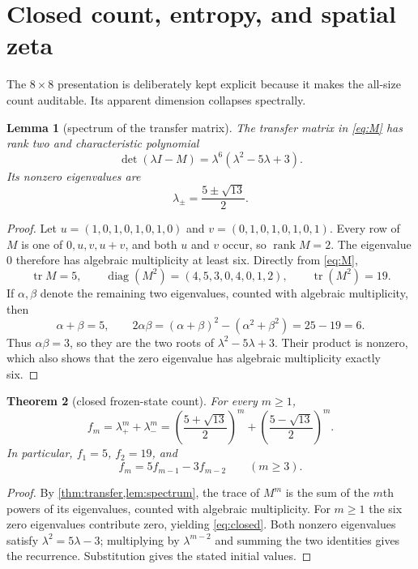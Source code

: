 \documentclass[11pt,a4paper]{amsart}
\newtheorem{theorem}{Theorem}[section]
\newtheorem{lemma}[theorem]{Lemma}
\theoremstyle{definition}
\theoremstyle{remark}
\newcommand{\tr}{\operatorname{tr}}
\begin{document}
\section{Closed count, entropy, and spatial zeta}

The $8\times8$ presentation is deliberately kept explicit because it makes
the all-size count auditable.  Its apparent dimension collapses
spectrally.

\begin{lemma}[spectrum of the transfer matrix]\label{lem:spectrum}
The transfer matrix in \eqref{eq:M} has rank two and characteristic
polynomial
\[
 \det(\lambda I-M)=\lambda^6(\lambda^2-5\lambda+3).
\]
Its nonzero eigenvalues are
\[
 \lambda_\pm=\frac{5\pm\sqrt{13}}2.
\]
\end{lemma}

\begin{proof}
Let $u=(1,0,1,0,1,0,1,0)$ and
$v=(0,1,0,1,0,1,0,1)$.  Every row of $M$ is one of
$0,u,v,u+v$, and both $u$ and $v$ occur, so $\operatorname{rank}M=2$.
The eigenvalue $0$ therefore has algebraic multiplicity at least six.
Directly from \eqref{eq:M},
\[
 \tr M=5,
 \qquad
 \operatorname{diag}(M^2)=(4,5,3,0,4,0,1,2),
 \qquad
 \tr(M^2)=19.
\]
If $\alpha,\beta$ denote the remaining two eigenvalues, counted with
algebraic multiplicity, then
\[
 \alpha+\beta=5,
 \qquad
 2\alpha\beta=(\alpha+\beta)^2-(\alpha^2+\beta^2)=25-19=6.
\]
Thus $\alpha\beta=3$, so they are the two roots of
$\lambda^2-5\lambda+3$.  Their product is nonzero, which also shows that
the zero eigenvalue has algebraic multiplicity exactly six.
\end{proof}

\begin{theorem}[closed frozen-state count]\label{thm:count}
For every $m\geq1$,
\begin{equation}\label{eq:closed}
 f_m=\lambda_+^m+\lambda_-^m
 =\left(\frac{5+\sqrt{13}}2\right)^m
  +\left(\frac{5-\sqrt{13}}2\right)^m.
\end{equation}
In particular, $f_1=5$, $f_2=19$, and
\[
 f_m=5f_{m-1}-3f_{m-2}\qquad(m\geq3).
\]
\end{theorem}

\begin{proof}
By \cref{thm:transfer,lem:spectrum}, the trace of $M^m$ is the sum of the
$m$th powers of its eigenvalues, counted with algebraic multiplicity.  For
$m\geq1$ the six zero eigenvalues contribute zero, yielding
\eqref{eq:closed}.  Both nonzero eigenvalues satisfy
$\lambda^2=5\lambda-3$; multiplying by $\lambda^{m-2}$ and summing the two
identities gives the recurrence.  Substitution gives the stated initial
values.
\end{proof}
\end{document}
